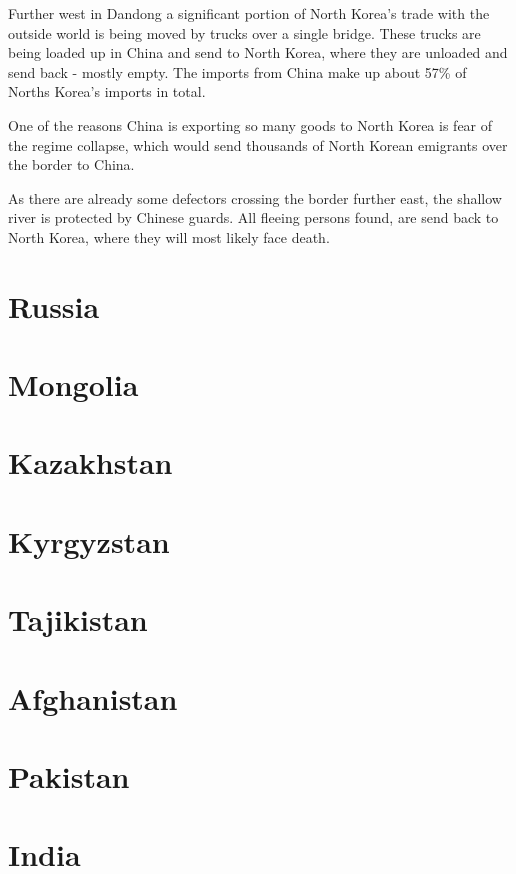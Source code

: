\documentclass[conference]{IEEEtran}
\begin{document}
	Further west in Dandong a significant portion of North Korea's trade with the outside world is being moved by trucks over a single bridge. These trucks are being loaded up in China and send to North Korea, where they are unloaded and send back - mostly empty. The imports from China make up about 57\%\cite{wp_economyOfNorthKorea} of Norths Korea's imports in total.
	
	One of the reasons China is exporting so many goods to North Korea is fear of the regime collapse, which would send thousands of North Korean emigrants over the border to China.
	
	As there are already some defectors crossing the border further east, the shallow river is protected by Chinese guards.\cite{yp_anInconvenientBorderWhereChinaMeetsNorthKoreaABCNews} All fleeing persons found, are send back to North Korea, where they will most likely face death.
	
	\section{Russia}
	
	\section{Mongolia}
	
	\section{Kazakhstan}
	
	\section{Kyrgyzstan}
	
	\section{Tajikistan}
	
	\section{Afghanistan}
	
	\section{Pakistan}
	
	\section{India}
	
\end{document}
